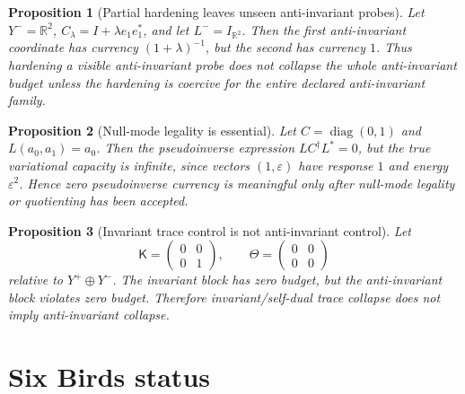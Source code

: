 \documentclass[11pt]{article}
\newtheorem{proposition}{Proposition}
\newcommand{\K}{\mathsf K}
\begin{document}
\begin{proposition}[Partial hardening leaves unseen anti-invariant probes]
Let \(Y^-=\mathbb R^2\), \(C_\lambda=I+\lambda e_1e_1^*\), and let \(L^-=I_{\mathbb R^2}\). Then the first anti-invariant coordinate has currency \((1+\lambda)^{-1}\), but the second has currency \(1\). Thus hardening a visible anti-invariant probe does not collapse the whole anti-invariant budget unless the hardening is coercive for the entire declared anti-invariant family.
\end{proposition}

\begin{proposition}[Null-mode legality is essential]
Let \(C=\operatorname{diag}(0,1)\) and \(L(a_0,a_1)=a_0\). Then the pseudoinverse expression \(LC^\dagger L^*=0\), but the true variational capacity is infinite, since vectors \((1,\varepsilon)\) have response \(1\) and energy \(\varepsilon^2\). Hence zero pseudoinverse currency is meaningful only after null-mode legality or quotienting has been accepted.
\end{proposition}

\begin{proposition}[Invariant trace control is not anti-invariant control]
Let
\begin{equation}
\K=\begin{pmatrix}0&0\\0&1\end{pmatrix},
\qquad
\Theta=\begin{pmatrix}0&0\\0&0\end{pmatrix}
\end{equation}
relative to \(Y^+\oplus Y^-\). The invariant block has zero budget, but the anti-invariant block violates zero budget. Therefore invariant/self-dual trace collapse does not imply anti-invariant collapse.
\end{proposition}

\section{Six Birds status}
\end{document}

